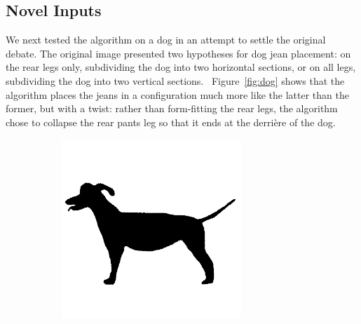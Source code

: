 \documentclass[twocolumn]{article}
\begin{document}
\subsection{Novel Inputs}
We next tested the algorithm on a dog in an attempt to settle the original debate. The original image presented two hypotheses for dog jean placement: on the rear legs only, subdividing the dog into two horizontal sections, or on all legs, subdividing the dog into two vertical sections.~\cite{utopian_raspberry} Figure~\ref{fig:dog} shows that the algorithm places the jeans in a configuration much more like the latter than the former, but with a twist: rather than form-fitting the rear legs, the algorithm chose to collapse the rear pants leg so that it ends at the derri\`ere of the dog.

\begin{figure}
    \begin{subfigure}{0.23\textwidth}
        \includegraphics[width=0.92\linewidth]{img/dog/target.png}
    \end{subfigure}
    \begin{subfigure}{0.23\textwidth}

\end{subfigure}
\end{figure}
\end{document}
